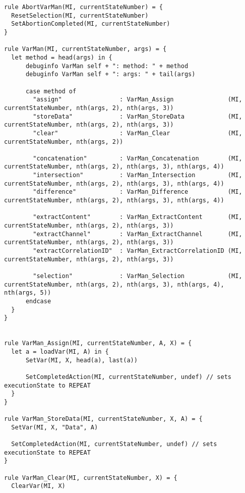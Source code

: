 \begin{listing}[H]
\begin{verbatim}
rule AbortVarMan(MI, currentStateNumber) = {
  ResetSelection(MI, currentStateNumber)
  SetAbortionCompleted(MI, currentStateNumber)
}

rule VarMan(MI, currentStateNumber, args) = {
  let method = head(args) in {
      debuginfo VarMan self + ": method: " + method
      debuginfo VarMan self + ": args: " + tail(args)

      case method of
        "assign"                : VarMan_Assign               (MI, currentStateNumber, nth(args, 2), nth(args, 3))
        "storeData"             : VarMan_StoreData            (MI, currentStateNumber, nth(args, 2), nth(args, 3))
        "clear"                 : VarMan_Clear                (MI, currentStateNumber, nth(args, 2))

        "concatenation"         : VarMan_Concatenation        (MI, currentStateNumber, nth(args, 2), nth(args, 3), nth(args, 4))
        "intersection"          : VarMan_Intersection         (MI, currentStateNumber, nth(args, 2), nth(args, 3), nth(args, 4))
        "difference"            : VarMan_Difference           (MI, currentStateNumber, nth(args, 2), nth(args, 3), nth(args, 4))

        "extractContent"        : VarMan_ExtractContent       (MI, currentStateNumber, nth(args, 2), nth(args, 3))
        "extractChannel"        : VarMan_ExtractChannel       (MI, currentStateNumber, nth(args, 2), nth(args, 3))
        "extractCorrelationID"  : VarMan_ExtractCorrelationID (MI, currentStateNumber, nth(args, 2), nth(args, 3))

        "selection"             : VarMan_Selection            (MI, currentStateNumber, nth(args, 2), nth(args, 3), nth(args, 4), nth(args, 5))
      endcase
  }
}


rule VarMan_Assign(MI, currentStateNumber, A, X) = {
  let a = loadVar(MI, A) in {
      SetVar(MI, X, head(a), last(a))

      SetCompletedAction(MI, currentStateNumber, undef) // sets executionState to REPEAT
  }
}

rule VarMan_StoreData(MI, currentStateNumber, X, A) = {
  SetVar(MI, X, "Data", A)

  SetCompletedAction(MI, currentStateNumber, undef) // sets executionState to REPEAT
}

rule VarMan_Clear(MI, currentStateNumber, X) = {
  ClearVar(MI, X)


\end{verbatim}
\end{listing}
